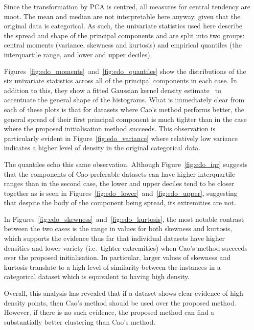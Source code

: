 Since the transformation by PCA is centred, all measures for central tendency
are moot. The mean and median are not interpretable here anyway, given that the
original data is categorical. As such, the univariate statistics used here
describe the spread and shape of the principal components and are split into
two groups: central moments (variance, skewness and kurtosis) and empirical
quantiles (the interquartile range, and lower and upper deciles).

Figures~\ref{fig:edo_moments}~and~\ref{fig:edo_quantiles} show the distributions
of the six univariate statistics across all of the principal components in each
case. In addition to this, they show a fitted Gaussian kernel density
estimate~\cite{Bashtannyk2001} to accentuate the general shape of the
histograms. What is immediately clear from each of these plots is that for
datasets where Cao's method performs better, the general spread of their first
principal component is much tighter than in the case where the proposed
initialisation method succeeds. This observation is particularly evident in
Figure~\ref{fig:edo_variance} where relatively low variance indicates a higher
level of density in the original categorical data.

The quantiles echo this same observation. Although Figure~\ref{fig:edo_iqr}
suggests that the components of Cao-preferable datasets can have higher
interquartile ranges than in the second case, the lower and upper deciles tend
to be closer together as is seen in
Figures~\ref{fig:edo_lower}~and~\ref{fig:edo_upper}, suggesting that despite the
body of the component being spread, its extremities are not.

In Figures~\ref{fig:edo_skewness}~and~\ref{fig:edo_kurtosis}, the most notable
contrast between the two cases is the range in values for both skewness and
kurtosis, which supports the evidence thus far that individual datasets have
higher densities and lower variety (i.e.\ tighter extremities) when Cao's method
succeeds over the proposed initialisation. In particular, larger values of
skewness and kurtosis translate to a high level of similarity between the
instances in a categorical dataset which is equivalent to having high density.

Overall, this analysis has revealed that if a dataset shows clear evidence of
high-density points, then Cao's method should be used over the proposed method.
However, if there is no such evidence, the proposed method can find a
substantially better clustering than Cao's method.

